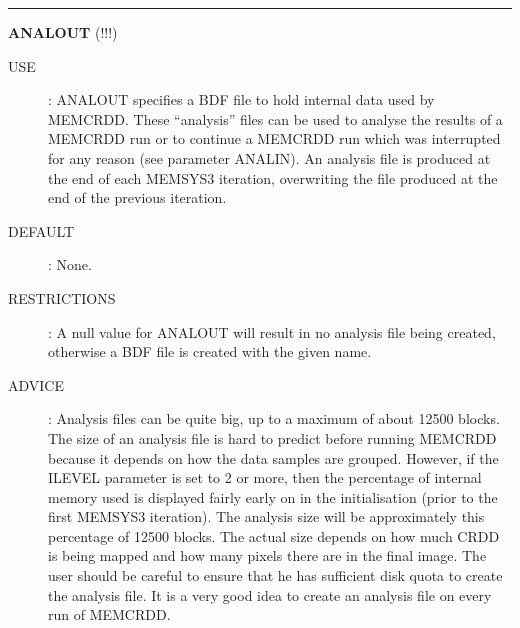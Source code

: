 \rule{\textwidth}{0.3mm}
{\Large {\bf ANALOUT} (!!!)}
\begin{description}
\item [USE]:
ANALOUT specifies a BDF file to hold internal data used by MEMCRDD. These
``analysis'' files can be used to analyse the results of a MEMCRDD run or
to continue a MEMCRDD run which was interrupted for any reason (see parameter
ANALIN). An analysis file is produced at the end of each MEMSYS3 iteration,
overwriting the file produced at the end of the previous iteration.
\item [DEFAULT]:
None.
\item [RESTRICTIONS]:
A null value for ANALOUT will result in no analysis file being created,
otherwise a BDF file is created with the given name.
\item [ADVICE]:
Analysis files can be quite big, up to a maximum of about 12500 blocks.
The size of an analysis file is hard to predict before running MEMCRDD because
it depends on how the data samples are grouped. However, if the ILEVEL
parameter is
set to 2 or more, then the percentage of internal memory used is displayed
fairly early on in the initialisation (prior to the first MEMSYS3 iteration).
The analysis size will be approximately this percentage of 12500 blocks.
The actual size depends on how much CRDD is being mapped and how many
pixels there are in the final image. The user should be careful to ensure that
he has sufficient disk quota to create the analysis file. It is a very good
idea to create an analysis file on every run of MEMCRDD.
\end {description}

